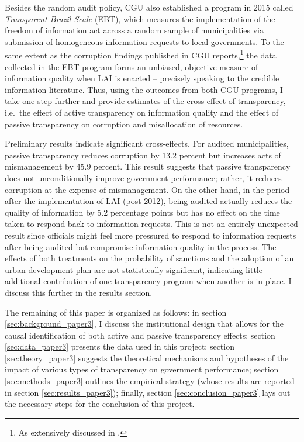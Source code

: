 \documentclass[11pt]{article}
\begin{document}
Besides the random audit policy, CGU also established a program in 2015 called \emph{Transparent Brazil Scale} (EBT), which measures the implementation of the freedom of information act across a random sample of municipalities via submission of homogeneous information requests to local governments. To the same extent as the corruption findings published in CGU reports,\footnote{As extensively discussed in \citet{FerrazExposingCorruptPoliticians2008b,FerrazElectoralAccountabilityCorruption2011a,BrolloPoliticalResourceCurse2013,ZamboniAuditRiskRent2018,AvisGovernmentAuditsReduce2018}.} the data collected in the EBT program forms an unbiased, objective measure of information quality when LAI is enacted -- precisely speaking to the credible information literature. Thus, using the outcomes from both CGU programs, I take one step further and provide estimates of the cross-effect of transparency, i.e.~the effect of active transparency on information quality and the effect of passive transparency on corruption and misallocation of resources.

Preliminary results indicate significant cross-effects. For audited municipalities, passive transparency reduces corruption by 13.2 percent but increases acts of mismanagement by 45.9 percent. This result suggests that passive transparency does not unconditionally improve government performance; rather, it reduces corruption at the expense of mismanagement. On the other hand, in the period after the implementation of LAI (post-2012), being audited actually reduces the quality of information by 5.2 percentage points but has no effect on the time taken to respond back to information requests. This is not an entirely unexpected result since officials might feel more pressured to respond to information requests after being audited but compromise information quality in the process. The effects of both treatments on the probability of sanctions and the adoption of an urban development plan are not statistically significant, indicating little additional contribution of one transparency program when another is in place. I discuss this further in the results section.

The remaining of this paper is organized as follows: in section \ref{sec:background_paper3}, I discuss the institutional design that allows for the causal identification of both active and passive transparency effects; section \ref{sec:data_paper3} presents the data used in this project; section \ref{sec:theory_paper3} suggests the theoretical mechanisms and hypotheses of the impact of various types of transparency on government performance; section \ref{sec:methods_paper3} outlines the empirical strategy (whose results are reported in section \ref{sec:results_paper3}); finally, section \ref{sec:conclusion_paper3} lays out the necessary steps for the conclusion of this project.
\end{document}
